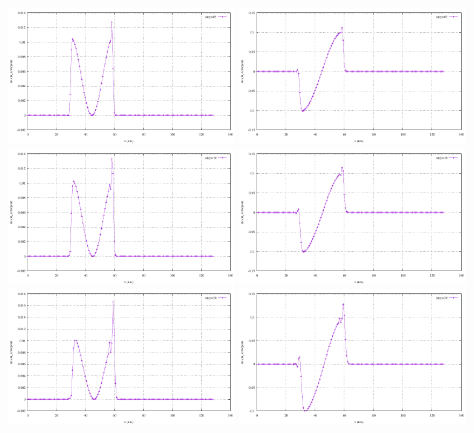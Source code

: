 \begin{center}
\includegraphics[width=6cm]{python_codes/fieldstone_54/images/exp7/n_dov_v_nx_005.pdf}
\includegraphics[width=6cm]{python_codes/fieldstone_54/images/exp7/n_dov_v_ny_005.pdf}\\
\includegraphics[width=6cm]{python_codes/fieldstone_54/images/exp7/n_dov_v_nx_010.pdf}
\includegraphics[width=6cm]{python_codes/fieldstone_54/images/exp7/n_dov_v_ny_010.pdf}\\
\includegraphics[width=6cm]{python_codes/fieldstone_54/images/exp7/n_dov_v_nx_020.pdf}
\includegraphics[width=6cm]{python_codes/fieldstone_54/images/exp7/n_dov_v_ny_020.pdf}
\end{center}

